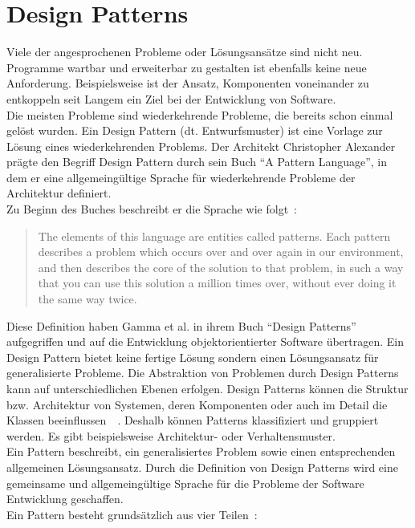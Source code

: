 \section{Design Patterns}
Viele der angesprochenen Probleme oder Lösungsansätze sind nicht neu. Programme wartbar und erweiterbar zu gestalten ist ebenfalls keine neue Anforderung. Beispielsweise ist der Ansatz, Komponenten voneinander zu entkoppeln seit Langem ein Ziel bei der Entwicklung von Software.\\
Die meisten Probleme sind wiederkehrende Probleme, die bereits schon einmal gelöst wurden. Ein Design Pattern (dt. Entwurfsmuster) ist eine Vorlage zur Lösung eines wiederkehrenden Problems. Der Architekt Christopher Alexander prägte den Begriff Design Pattern durch sein Buch \enquote{A Pattern Language}, in dem er eine allgemeingültige Sprache für wiederkehrende Probleme der Architektur definiert.\\
Zu Beginn des Buches beschreibt er die Sprache wie folgt~\cite[S. \textit{x}]{alexander_pattern_1977}:

\begin{quotation}
The elements of this language are entities called patterns. Each pattern describes a problem which occurs over and over again in our environment, and then describes the core of the solution to that problem, in such a way that you can use this solution a million times over, without ever doing it the same way twice.
\end{quotation}

Diese Definition haben Gamma et al. in ihrem Buch \enquote{Design Patterns} aufgegriffen und auf die Entwicklung objektorientierter Software übertragen. Ein Design Pattern bietet keine fertige Lösung sondern einen Lösungsansatz für generalisierte Probleme. Die Abstraktion von Problemen durch Design Patterns kann auf unterschiedlichen Ebenen erfolgen. Design Patterns können die Struktur bzw. Architektur von Systemen, deren Komponenten oder auch im Detail die Klassen beeinflussen~\cite[S.~3]{gamma_design_1995}~\cite[S.~127]{douglass_real-time_2003}. Deshalb können Patterns klassifiziert und gruppiert werden. Es gibt beispielsweise Architektur- oder Verhaltensmuster.\\
Ein Pattern beschreibt, ein generalisiertes Problem sowie einen entsprechenden allgemeinen Lösungsansatz. Durch die Definition von Design Patterns wird eine gemeinsame und allgemeingültige Sprache für die Probleme der Software Entwicklung geschaffen.\\
Ein Pattern besteht grundsätzlich aus vier Teilen~\cite[S.~3]{gamma_design_1995}:

